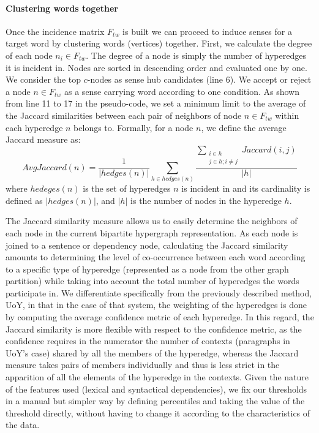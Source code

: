 \paragraph{Clustering words  together}
Once the incidence matrix $F_{tw}$ is built we can proceed to induce senses for a target word by clustering words (vertices) together. First, we calculate the degree of each node $n_i \in F_{tw}$. The degree of a node is simply the number of hyperedges it is incident in. Nodes are sorted in descending order and evaluated one by one. We consider the top $c$-nodes as sense hub candidates (line 6). We accept or reject a node $n \in F_{tw}$ as a sense carrying word according to one condition. As shown from line 11 to 17 in the pseudo-code, we set a minimum limit to the average of the Jaccard similarities between each pair of neighbors of node $n \in F_{tw}$ within each hyperedge  $n$ belongs to. Formally, for a node $n$, we define the average Jaccard measure as: $$AvgJaccard(n)=\frac{1}{|hedges(n)|}\sum_{h\in hedges(n)}\frac{\sum_{\substack{i\in h\\j\in h;i\neq j}}Jaccard(i,j)}{|h|}$$ 
where $hedeges(n)$ is the set of hyperedges $n$ is incident in and its cardinality is defined as $|hedges(n)|$, and $|h|$ is the number of nodes in the hyperedge $h$. 

The Jaccard similarity measure allows us to easily determine the neighbors of each node in the current bipartite hypergraph representation. As each node is joined to a sentence or dependency node, calculating the Jaccard similarity amounts to determining the level of co-occurrence between each word according to a specific type of hyperedge (represented as a node from the other graph partition) while taking into account the total number of hyperedges the words participate in. We differentiate specifically from the previously described method, UoY, in that in the case of that system, the weighting of the hyperedges is done by computing the average confidence metric of each hyperedge. In this regard, the Jaccard similarity is more flexible with respect to the confidence metric, as the confidence requires in the numerator the number of contexts (paragraphs in UoY's case) shared by all the members of the hyperedge, whereas the Jaccard measure takes pairs of members individually and thus is less strict in the apparition of all the elements of the hyperedge in the contexts. Given the nature of the features used (lexical and syntactical dependencies), we fix our thresholds in a manual but simpler way by defining percentiles and taking the value of the threshold directly, without having to change it according to the characteristics of the data.


